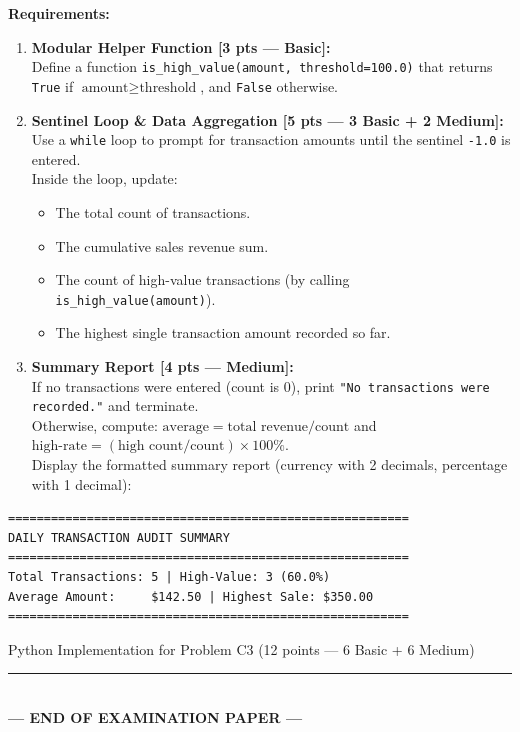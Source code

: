 \documentclass[11pt,a4paper]{article}
\begin{document}
\textbf{Requirements:}
\begin{enumerate}[label=\arabic*.,leftmargin=1.8em,itemsep=0.5pt]
  \item \textbf{Modular Helper Function [3 pts --- Basic]:}\\
    Define a function \texttt{is\_high\_value(amount, threshold=100.0)} that returns \texttt{True} if $\text{amount} \ge \text{threshold}$, and \texttt{False} otherwise.
  \item \textbf{Sentinel Loop \& Data Aggregation [5 pts --- 3 Basic + 2 Medium]:}\\
    Use a \texttt{while} loop to prompt for transaction amounts until the sentinel \texttt{-1.0} is entered.\\
    Inside the loop, update:
    \begin{itemize}[itemsep=0.1pt]
      \item The total count of transactions.
      \item The cumulative sales revenue sum.
      \item The count of high-value transactions (by calling \texttt{is\_high\_value(amount)}).
      \item The highest single transaction amount recorded so far.
    \end{itemize}
  \item \textbf{Summary Report [4 pts --- Medium]:}\\
    If no transactions were entered (count is 0), print \texttt{"No transactions were recorded."} and terminate.\\
    Otherwise, compute:
    $\text{average} = \text{total revenue} / \text{count}$ \quad and \quad
    $\text{high-rate} = (\text{high count} / \text{count}) \times 100\%$.\\
    Display the formatted summary report (currency with 2 decimals, percentage with 1 decimal):
\end{enumerate}

\begin{lstlisting}[basicstyle=\ttfamily\scriptsize]
========================================================
DAILY TRANSACTION AUDIT SUMMARY
========================================================
Total Transactions: 5 | High-Value: 3 (60.0%)
Average Amount:     $142.50 | Highest Sale: $350.00
========================================================
\end{lstlisting}

\begin{answerbox}[height=8.8cm]{Python Implementation for Problem C3 (12 points --- 6 Basic + 6 Medium)}
\end{answerbox}

\vfill
\begin{center}
  \rule{0.5\textwidth}{0.4pt}\\[0.8mm]
  \textbf{\color{primaryblue}--- END OF EXAMINATION PAPER ---}
\end{center}
\end{document}
